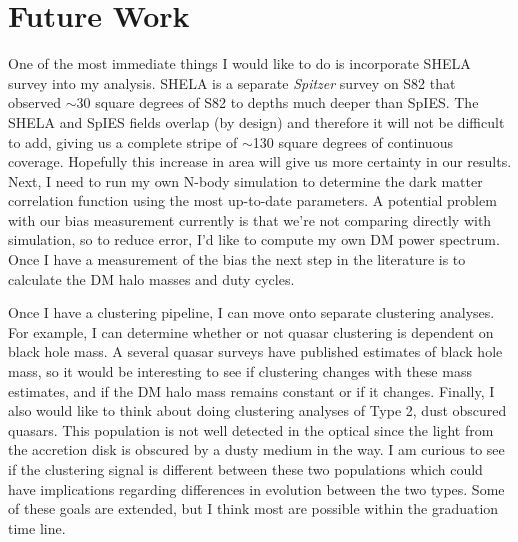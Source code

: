 \documentclass[onecolumn]{emulateapj}
\begin{document}
\section{Future Work}\label{future_work}
One of the most immediate things I would like to do is incorporate SHELA survey \citep{Papovich2011} into my analysis. SHELA is a separate \emph{Spitzer} survey on S82 that observed $\sim$30 square degrees of S82 to depths much deeper than SpIES. The SHELA and SpIES fields overlap (by design) and therefore it will not be difficult to add, giving us a complete stripe of $\sim$130 square degrees of continuous coverage. Hopefully this increase in area will give us more certainty in our results. Next, I need to run my own N-body simulation to determine the dark matter correlation function using the most up-to-date parameters. A potential problem with our bias measurement currently is that we're not comparing directly with simulation, so to reduce error, I'd like to compute my own DM power spectrum. Once I have a measurement of the bias the next step in the literature is to calculate the DM halo masses and duty cycles.

Once I have a clustering pipeline, I can move onto separate clustering analyses. For example, I can determine whether or not quasar clustering is dependent on black hole mass. A several quasar surveys have published estimates of black hole mass, so it would be interesting to see if clustering changes with these mass estimates, and if the DM halo mass remains constant or if it changes. Finally, I also would like to think about doing clustering analyses of Type 2, dust obscured quasars. This population is not well detected in the optical since the light from the accretion disk is obscured by a dusty medium in the way. I am curious to see if the clustering signal is different between these two populations which could have implications regarding differences in evolution between the two types. Some of these goals are extended, but I think most are possible within the graduation time line.





\end{document}
